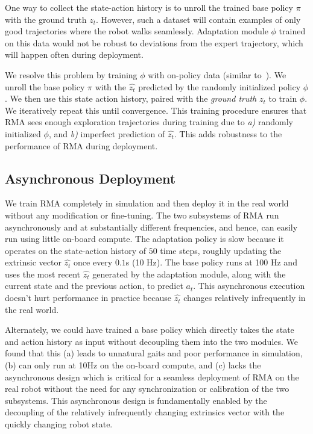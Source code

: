 \documentclass[conference]{IEEEtran}
\newcommand{\algo}{RMA}
\newcommand{\aravind}[1]{{\color{blue} {Aravind: {#1}}}}
\begin{document}
One way to collect the state-action history is to unroll the trained base policy $\pi$ with the ground truth $z_t$. However, such a dataset will contain examples of only good trajectories where the robot walks seamlessly. Adaptation module $\phi$ trained on this data would not be robust to deviations from the expert trajectory, which will happen often during deployment. 

We resolve this problem by training $\phi$ with on-policy data (similar to~\citet{ross2011reduction}). We unroll the base policy $\pi$ with the $\hat{z_t}$ predicted by the randomly initialized policy $\phi$. We then use this state action history, paired with the \textit{ground truth} $z_t$ to train $\phi$. We iteratively repeat this until convergence. This training procedure ensures that \algo{} sees enough exploration trajectories during training due to \textit{a)} randomly initialized $\phi$, and \textit{b)} imperfect prediction of $\hat{z_t}$. This adds robustness to the performance of \algo{} during deployment. 

\subsection{Asynchronous Deployment}
We train \algo{} completely in simulation and then deploy it in the real world without any modification or fine-tuning. 
The two subsystems of \algo{} run asynchronously and at substantially different frequencies, and hence, can easily run using little on-board compute. The adaptation policy is slow because it operates on the state-action history of $50$ time steps, roughly updating the extrinsic vector $\hat{z_t}$ once every $0.1$s (10 Hz). The base policy runs at 100 Hz and uses the most recent $\hat{z_t}$ generated by the adaptation module, along with the current state and the previous action, to predict $a_t$. This asynchronous execution doesn't hurt performance in practice because $\hat{z_t}$ changes relatively infrequently in the real world.

Alternately, we could have trained a base policy which directly takes the state and action history as input without decoupling them into the two modules. We found that this (a) leads to unnatural gaits and poor performance in simulation, (b) can only run at 10Hz on the on-board compute, and (c) lacks the asynchronous design which is critical for a seamless deployment of \algo{} on the real robot without the need for any synchronization or calibration of the two subsystems. This asynchronous design is fundamentally enabled by the decoupling of the relatively infrequently changing extrinsics vector with the quickly changing robot state.
\end{document}
